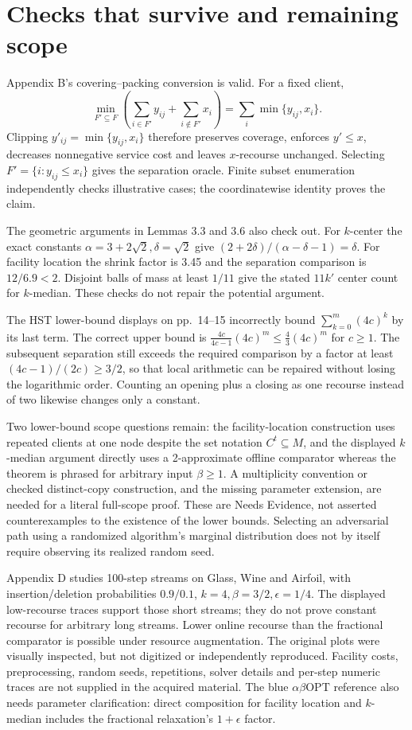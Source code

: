 \documentclass[10pt]{article}
\begin{document}
\section*{Checks that survive and remaining scope}
Appendix B’s covering–packing conversion is valid. For a fixed client, \[\min_{F'\subseteq F}\left(\sum_{i\in F'}y_{ij}
+\sum_{i\notin F'}x_i\right)=\sum_i\min\{y_{ij},x_i\}.\] Clipping \(y'_{ij}=\min\{y_{ij},x_i\}\) therefore preserves coverage, enforces \(y'\le x\), decreases nonnegative service cost and leaves \(x\)-recourse unchanged. Selecting \(F'=\{i:y_{ij}\le x_i\}\) gives the separation oracle. Finite subset enumeration independently checks illustrative cases; the coordinatewise identity proves the claim.\par
The geometric arguments in Lemmas 3.3 and 3.6 also check out. For \(k\)-center the exact constants \(\alpha=3+2\sqrt2,\delta=\sqrt2\) give \((2+2\delta)/(\alpha-\delta-1)=\delta\). For facility location the shrink factor is 3.45 and the separation comparison is \(12/6.9<2\). Disjoint balls of mass at least \(1/11\) give the stated \(11k'\) center count for \(k\)-median. These checks do not repair the potential argument.\par
The HST lower-bound displays on pp. 14–15 incorrectly bound \(\sum_{k=0}^{m}(4c)^k\) by its last term. The correct upper bound is \(\frac{4c}{4c-1}(4c)^m\le\frac43(4c)^m\) for \(c\ge1\). The subsequent separation still exceeds the required comparison by a factor at least \((4c-1)/(2c)\ge3/2\), so that local arithmetic can be repaired without losing the logarithmic order. Counting an opening plus a closing as one recourse instead of two likewise changes only a constant.\par
Two lower-bound scope questions remain: the facility-location construction uses repeated clients at one node despite the set notation \(C^t\subseteq M\), and the displayed \(k\)-median argument directly uses a 2-approximate offline comparator whereas the theorem is phrased for arbitrary input \(\beta\ge1\). A multiplicity convention or checked distinct-copy construction, and the missing parameter extension, are needed for a literal full-scope proof. These are Needs Evidence, not asserted counterexamples to the existence of the lower bounds. Selecting an adversarial path using a randomized algorithm’s marginal distribution does not by itself require observing its realized random seed.\par
Appendix D studies 100-step streams on Glass, Wine and Airfoil, with insertion/deletion probabilities \(0.9/0.1\), \(k=4,\beta=3/2,\epsilon=1/4\). The displayed low-recourse traces support those short streams; they do not prove constant recourse for arbitrary long streams. Lower online recourse than the fractional comparator is possible under resource augmentation. The original plots were visually inspected, but not digitized or independently reproduced. Facility costs, preprocessing, random seeds, repetitions, solver details and per-step numeric traces are not supplied in the acquired material. The blue \(\alpha\beta\mathrm{OPT}\) reference also needs parameter clarification: direct composition for facility location and \(k\)-median includes the fractional relaxation’s \(1+\epsilon\) factor.\par
\end{document}
